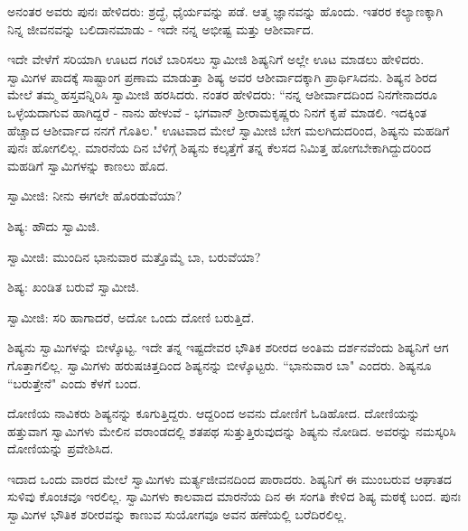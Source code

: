 ಅನಂತರ ಅವರು ಪುನಃ ಹೇಳಿದರು: ಶ್ರದ್ಧೆ, ಧೈರ್ಯವನ್ನು ಪಡೆ. ಆತ್ಮ ಜ್ಞಾನವನ್ನು ಹೊಂದು. ಇತರರ ಕಲ್ಯಾಣಕ್ಕಾಗಿ ನಿನ್ನ ಜೀವನವನ್ನು ಬಲಿದಾನಮಾಡು - ಇದೇ ನನ್ನ ಅಭೀಷ್ಟ ಮತ್ತು ಆಶೀರ್ವಾದ.

ಇದೇ ವೇಳೆಗೆ ಸರಿಯಾಗಿ ಊಟದ ಗಂಟೆ ಬಾರಿಸಲು ಸ್ವಾಮೀಜಿ ಶಿಷ್ಯನಿಗೆ ಅಲ್ಲೇ ಊಟ ಮಾಡಲು ಹೇಳಿದರು. ಸ್ವಾಮಿಗಳ ಪಾದಕ್ಕೆ ಸಾಷ್ಟಾಂಗ ಪ್ರಣಾಮ ಮಾಡುತ್ತಾ ಶಿಷ್ಯ ಅವರ ಆಶೀರ್ವಾದಕ್ಕಾಗಿ ಪ್ರಾರ್ಥಿಸಿದನು. ಶಿಷ್ಯನ ಶಿರದ ಮೇಲೆ ತಮ್ಮ ಹಸ್ತವನ್ನಿರಿಸಿ ಸ್ವಾಮೀಜಿ ಹರಸಿದರು. ನಂತರ ಹೇಳಿದರು: “ನನ್ನ ಆಶೀರ್ವಾದದಿಂದ ನಿನಗೇನಾದರೂ ಒಳ್ಳೆಯದಾಗುವ ಹಾಗಿದ್ದರೆ - ನಾನು ಹೇಳುವೆ - ಭಗವಾನ್ ಶ‍್ರೀರಾಮಕೃಷ್ಣರು ನಿನಗೆ ಕೃಪೆ ಮಾಡಲಿ. ಇದಕ್ಕಿಂತ ಹೆಚ್ಚಾದ ಆಶೀರ್ವಾದ ನನಗೆ ಗೊತಿಲ." ಊಟವಾದ ಮೇಲೆ ಸ್ವಾಮೀಜಿ ಬೇಗ ಮಲಗಿದುದರಿಂದ, ಶಿಷ್ಯನು ಮಹಡಿಗೆ ಪುನಃ ಹೋಗಲಿಲ್ಲ. ಮಾರನೆಯ ದಿನ ಬೆಳಿಗ್ಗೆ ಶಿಷ್ಯನು ಕಲ್ಕತ್ತೆಗೆ ತನ್ನ ಕೆಲಸದ ನಿಮಿತ್ತ ಹೋಗಬೇಕಾಗಿದ್ದುದರಿಂದ ಮಹಡಿಗೆ ಸ್ವಾಮಿಗಳನ್ನು ಕಾಣಲು ಹೊದ.

ಸ್ವಾಮೀಜಿ: ನೀನು ಈಗಲೇ ಹೊರಡುವೆಯಾ?

ಶಿಷ್ಯ: ಹೌದು ಸ್ವಾಮಿಜಿ.

ಸ್ವಾಮೀಜಿ: ಮುಂದಿನ ಭಾನುವಾರ ಮತ್ತೊಮ್ಮೆ ಬಾ, ಬರುವೆಯಾ?

ಶಿಷ್ಯ: ಖಂಡಿತ ಬರುವೆ ಸ್ವಾಮೀಜಿ.

ಸ್ವಾಮೀಜಿ: ಸರಿ ಹಾಗಾದರೆ, ಅದೋ ಒಂದು ದೋಣಿ ಬರುತ್ತಿದೆ.

ಶಿಷ್ಯನು ಸ್ವಾಮಿಗಳನ್ನು ಬೀಳ್ಕೊಟ್ಟ. ಇದೇ ತನ್ನ ಇಷ್ಟದೇವರ ಭೌತಿಕ ಶರೀರದ ಅಂತಿಮ ದರ್ಶನವೆಂದು ಶಿಷ್ಯನಿಗೆ ಆಗ ಗೊತ್ತಾಗಲಿಲ್ಲ. ಸ್ವಾಮಿಗಳು ಹರುಷಚಿತ್ತದಿಂದ ಶಿಷ್ಯನನ್ನು ಬೀಳ್ಕೊಟ್ಟರು. “ಭಾನುವಾರ ಬಾ" ಎಂದರು. ಶಿಷ್ಯನೂ “ಬರುತ್ತೇನೆ" ಎಂದು ಕೆಳಗೆ ಬಂದ.

ದೋಣಿಯ ನಾವಿಕರು ಶಿಷ್ಯನನ್ನು ಕೂಗುತ್ತಿದ್ದರು. ಆದ್ದರಿಂದ ಅವನು ದೋಣಿಗೆ ಓಡಿಹೋದ. ದೋಣಿಯನ್ನು ಹತ್ತುವಾಗ ಸ್ವಾಮಿಗಳು ಮೇಲಿನ ವರಾಂಡದಲ್ಲಿ ಶತಪಥ ಸುತ್ತುತ್ತಿರುವುದನ್ನು ಶಿಷ್ಯನು ನೋಡಿದ. ಅವರನ್ನು ನಮಸ್ಕರಿಸಿ ದೋಣಿಯನ್ನು ಪ್ರವೇಶಿಸಿದ.

ಇದಾದ ಒಂದು ವಾರದ ಮೇಲೆ ಸ್ವಾಮಿಗಳು ಮರ್ತ್ಯಜೀವನದಿಂದ ಪಾರಾದರು. ಶಿಷ್ಯನಿಗೆ ಈ ಮುಂಬರುವ ಆಘಾತದ ಸುಳಿವು ಕೊಂಚವೂ ಇರಲಿಲ್ಲ. ಸ್ವಾಮಿಗಳು ಕಾಲವಾದ ಮಾರನೆಯ ದಿನ ಈ ಸಂಗತಿ ಕೇಳಿದ ಶಿಷ್ಯ ಮಠಕ್ಕೆ ಬಂದ. ಪುನಃ ಸ್ವಾಮಿಗಳ ಭೌತಿಕ ಶರೀರವನ್ನು ಕಾಣುವ ಸುಯೋಗವೂ ಅವನ ಹಣೆಯಲ್ಲಿ ಬರೆದಿರಲಿಲ್ಲ.


